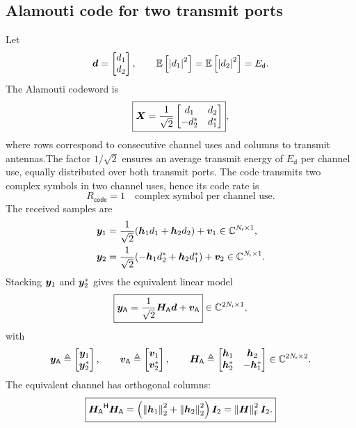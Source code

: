 \subsection{Alamouti code for two transmit ports}
Let
\[
\bm{d}=\begin{bmatrix}d_1\\d_2\end{bmatrix},
\qquad
\mathbb{E}\left[\left|d_1\right|^2\right]=\mathbb{E}\left[\left|d_2\right|^2\right]=E_{\mathsf{d}}.
\]
The Alamouti codeword is
\begin{equation}\label{eq:alamouti-block}
	\boxed{
		\bm{X}
		=\frac{1}{\sqrt{2}}
		\begin{bmatrix}
			d_1 & d_2\\
			-d_2^* & d_1^*
	\end{bmatrix}},
\end{equation}
where rows correspond to consecutive channel uses and columns to transmit antennas.The factor \(1/\sqrt{2}\) ensures an average transmit energy of \(E_{\mathsf d}\) per channel use, equally distributed over both transmit ports. The code transmits two complex symbols in two channel uses, hence its code rate is
\[
R_{\mathsf{code}}=1
\quad \text{complex symbol per channel use.}
\]
The received samples are
\begin{align*}
	\bm{y}_1&=\frac{1}{\sqrt{2}}(\bm{h}_1d_1+\bm{h}_2d_2)+\bm{v}_1 \in \mathbb{C}^{N_{\mathsf{r}}\times 1},\\
	\bm{y}_2&=\frac{1}{\sqrt{2}}(-\bm{h}_1d_2^*+\bm{h}_2d_1^*)+\bm{v}_2 \in \mathbb{C}^{N_{\mathsf{r}}\times 1}.
\end{align*}
Stacking $\bm{y}_1$ and $\bm{y}_2^*$ gives the equivalent linear model
\begin{equation}\label{eq:alamouti-equiv}
	\boxed{
		\bm{y}_{\mathsf A}
		=\frac{1}{\sqrt{2}}\bm{H}_{\mathsf A}\bm{d}
		+\bm{v}_{\mathsf A}} \in \mathbb{C}^{2N_{\mathsf{r}}\times 1},
\end{equation}
with
\[
\bm{y}_{\mathsf A}\triangleq
\begin{bmatrix}\bm{y}_1\\\bm{y}_2^*\end{bmatrix},
\qquad
\bm{v}_{\mathsf A}\triangleq
\begin{bmatrix}\bm{v}_1\\\bm{v}_2^*\end{bmatrix},
\qquad
\bm{H}_{\mathsf A}\triangleq
\begin{bmatrix}
\bm{h}_1 &\bm{h}_2\\
	\bm{h}_2^* & -\bm{h}_1^*
\end{bmatrix} \in \mathbb{C}^{2N_{\mathsf{r}}\times 2}.
\]
The equivalent channel has orthogonal columns:
\begin{equation}\label{eq:alamouti-orth}
	\boxed{
		{\bm{H}_{\mathsf A}}^{\mathsf{H}}\bm{H}_{\mathsf A}
		= \left(\left\|\bm{h}_1\right\|_2^2+\left\|\bm{h}_2\right\|_2^2\right)\bm{I}_2 = \left\|\bm{H}\right\|_{\mathsf{F}}^2\bm{I}_2.
	}
\end{equation}

